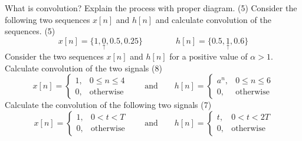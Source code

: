 \documentclass[a4paper,11pt]{exam}
\begin{document}
\begin{questions}
    \question What is convolution? Explain the process with proper diagram. \hfill (5)
    \question Consider the following two sequences $x[n]$ and $h[n]$ and calculate convolution of the sequences. \hfill (5)
    $$ x[n] = \{1,\underset{\uparrow}{0}, 0.5,0.25\} \qquad  \qquad h[n] = \{0.5,\underset{\uparrow}{1}, 0.6\}$$ 
    \question Consider the two sequences $x[n]$ and $h[n]$ for a positive value of $\alpha > 1$. Calculate convolution of the two signals \hfill (8)
    $$ x[n] = \begin{cases}
        1, & 0\leq n \leq 4 \\
        0, & \text{otherwise}
    \end{cases} \qquad \text{and} \qquad h[n] = \begin{cases}
        a^n, & 0\leq n \leq 6 \\ 
        0, & \text{otherwise}
    \end{cases} $$
    \question Calculate the convolution of the following two signals \hfill (7)
    $$ x[n] = \begin{cases}
        1, & 0< t < T \\
        0, & \text{otherwise}
    \end{cases} \qquad \text{and} \qquad h[n] = \begin{cases}
        t, & 0 < t < 2T \\ 
        0, & \text{otherwise}
    \end{cases} $$
\end{questions}
\end{document}
